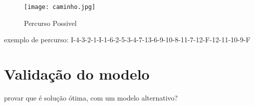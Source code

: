 \documentclass[runningheads]{llncs}
\begin{document}
    \clearpage

    \begin{figure}[h]
        \centering
        \texttt{[image: caminho.jpg]}
        \caption{Percurso Possivel}
        \label{fig:data4}
    \end{figure}


    exemplo de percurso: I-4-3-2-1-I-1-6-2-5-3-4-7-13-6-9-10-8-11-7-12-F-12-11-10-9-F



    \section{Validação do modelo}

    provar que é solução ótima, com um modelo alternativo?
\end{document}
